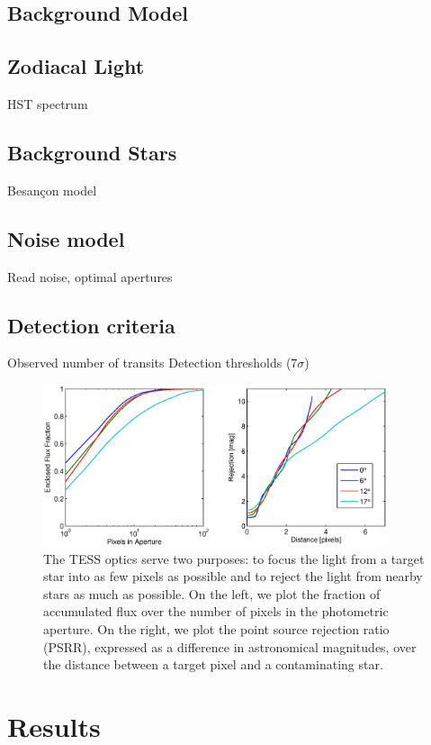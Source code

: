 \documentclass[preprint]{aastex}
\begin{document}
\subsection{Background Model}
\subsection{Zodiacal Light}
HST spectrum
\subsection{Background Stars}
Besan\c{c}on model
\subsection{Noise model}
Read noise, optimal apertures
\subsection{Detection criteria}
Observed number of transits
Detection thresholds (7$\sigma$)

\begin{figure}[hbtp]
\begin{center}
\includegraphics[width=0.9\textwidth]{npix.eps}
\caption{The TESS optics serve two purposes: to focus the light from a target star into as few pixels as possible and to reject the light from nearby stars as much as possible. On the left, we plot the fraction of accumulated flux over the number of pixels in the photometric aperture. On the right, we plot the point source rejection ratio (PSRR), expressed as a difference in astronomical magnitudes, over the distance between a target pixel and a contaminating star.}
\end{center}
\end{figure}

\section{Results}
\end{document}
